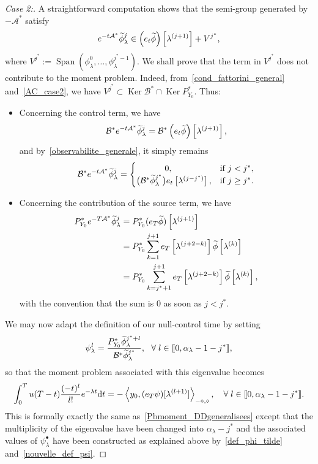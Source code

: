 \documentclass[AHL,Unicode,longabstracts]{cedram}
\newenvironment{step}[1]{\begin{proof}[#1]}{\let\qed\relax\end{proof}}
\newcommand{\llbracket}{\mathopen{[\mkern -2.7mu[}}
\newcommand{\rrbracket}{\mathclose{]\mkern -2.7mu]}}
\newcommand{\inter}[2]{\llbracket #1,#2 \rrbracket}
\newcommand\As{\mathcal{A}^*}
\newcommand\Bs{\mathcal{B}^*}
\newcommand{\Fzp}{Y_0}
\newcommand{\dual}[2]{\left\langle #1, #2 \right\rangle_{-\diamond,\diamond}}
\newcommand{\PFa}{P_{\Fzp}^*}
\newcommand{\md}{\mathrm{d}}
\DeclareMathOperator{\Span}{Span}
\DeclareMathOperator{\Ker}{Ker}
\renewcommand{\cdot}{{\scriptstyle \bullet}}
\let\oldtilde\tilde
\renewcommand*{\tilde}[1]{\mathchoice{\widetilde{#1}}{\widetilde{#1}}{\oldtilde{#1}}{\oldtilde{#1}}}\let\oldexists\exists
\renewcommand*{\exists}{\mathrel{\oldexists}}
\let\oldforall\forall
\renewcommand*{\forall}{\mathrel{\oldforall}}
\begin{document}
\begin{step}{Case 2:}
A straightforward computation shows that the semi-group generated by $-\As$ satisfy
\[
e^{-t\As} \tilde{\phi}_\lambda^j \in \left(e_t \tilde{\phi}\right)\left[\lambda^{(j+1)}\right] + V^{j^*},
\]
where $V^{j^*} :=
\Span (\phi_\lambda^0,\ldots,\phi_\lambda^{j^*-1})$. We shall prove that the term in $V^{j^*}$ does not contribute to the moment problem. Indeed, from~\eqref{cond_fattorini_general} and~\eqref{AC_case2}, we have $V^{j^*} \subset \Ker \Bs \cap \Ker \PFa$. Thus:
\begin{itemize}
\item Concerning the control term, we have
\[
\Bs e^{-t\As} \tilde{\phi}_\lambda^j = \Bs \left(e_t \tilde{\phi}\right)\left[\lambda^{(j+1)}\right],
\]
and by~\eqref{observabilite_generale}, it simply remains
\[
\Bs e^{-t\As} \tilde{\phi}_\lambda^j =
\begin{cases}
\mkern60mu 0,& \text{if } j<j^*,\\
\big(\Bs \tilde{\phi}_{\lambda}^{j^*}\big) e_t\left[\lambda^{(j-j^*)}\right],& \text{if }j\geq j^*.
\end{cases}
\]
\item Concerning the contribution of the source term, we have
\begin{align*}
\PFa e^{-T\As} \tilde{\phi}_\lambda^j & = \PFa (e_T \tilde{\phi})\left[\lambda^{(j+1)}\right]\\
& = \PFa \sum_{k=1}^{j+1} e_T\left[\lambda^{(j+2-k)}\right] \tilde{\phi}\left[\lambda^{(k)}\right]\\
& = \PFa \sum_{k=j^*+1}^{j+1} e_T\left[\lambda^{(j+2-k)}\right] \tilde{\phi}\left[\lambda^{(k)}\right],
\end{align*}
with the convention that the sum is $0$ as soon as $j<j^*$.
\end{itemize}
We may now adapt the definition of our null-control time by setting
\begin{equation}\label{nouvelle_def_psi}
\psi_\lambda^l = \frac{\PFa \tilde{\phi}_\lambda^{j^*+l}}{\Bs \tilde{\phi}_\lambda^{j^*}}, \ \ \forall l\in \inter{0}{\alpha_\lambda-1-j^*},
\end{equation}
so that the moment problem associated with this eigenvalue becomes
\begin{equation*}
\int_0^T u(T-t) \frac{(-t)^l}{l!} e^{-\lambda t} \md t = -\dual{y_0}{(e_T \psi)[\lambda^{(l+1)}]}, \quad \forall l \in \inter{0}{\alpha_\lambda-1-j^*}.
\end{equation*}
This is formally exactly the same as~\eqref{Pbmoment_DDgeneralisees} except that the multiplicity of the eigenvalue have been changed into $\alpha_\lambda-j^*$ and the associated values of $\psi_\lambda^\cdot$ have been constructed as explained above by~\eqref{def_phi_tilde} and~\eqref{nouvelle_def_psi}.
\end{step}
\end{document}
